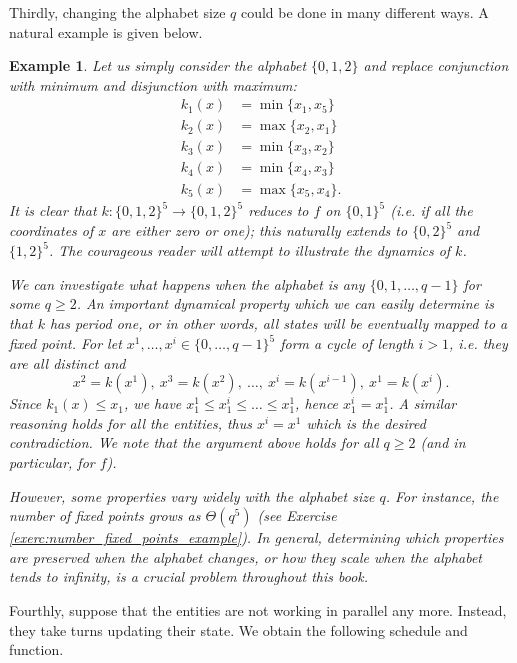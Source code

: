 \documentclass[a4paper, 11pt]{book}
\numberwithin{equation}{section}
\theoremstyle{plain}
\newtheorem{example}	[equation]	{Example}
\renewcommand{\(}{\ldbrack}
\renewcommand{\)}{\rdbrack}
\begin{document}
Thirdly, changing the alphabet size $q$ could be done in many different ways. A natural example is given below.



\begin{example} \label{ex:3_vecC5}
Let us simply consider the alphabet $\{0, 1, 2\}$ and replace conjunction with minimum and disjunction with maximum:
\begin{align*}
	k_1(x) &= \min\{x_1, x_5\}\\
	k_2(x) &= \max\{x_2, x_1\}\\
	k_3(x) &= \min\{x_3, x_2\}\\
	k_4(x) &= \min\{x_4, x_3\}\\
	k_5(x) &= \max\{x_5, x_4\}.
\end{align*}
It is clear that $k : \{0, 1, 2\}^5 \to \{0, 1, 2\}^5$ reduces to $f$ on $\{0,1\}^5$ (i.e. if all the coordinates of $x$ are either zero or one); this naturally extends to $\{0,2\}^5$ and $\{1,2\}^5$. The courageous reader will attempt to illustrate the dynamics of $k$. 

We can investigate what happens when the alphabet is any $\{0, 1, \dots, q-1\}$ for some $q \ge 2$. An important dynamical property which we can easily determine is that $k$ has period one, or in other words, all states will be eventually mapped to a fixed point. For let $x^1, \dots, x^i \in \{0, \dots, q-1\}^5$ form a cycle of length $i > 1$, i.e. they are all distinct and
\[
	x^2 = k(x^1), \ x^3 = k(x^2), \ \dots, \ x^i = k(x^{i-1}), \ x^1 = k(x^i).
\]
Since $k_1(x) \le x_1$, we have $x^1_1 \le x^i_1 \le \dots \le x^1_1$, hence $x^i_1 = x^1_1$. A similar reasoning holds for all the entities, thus $x^i = x^1$ which is the desired contradiction. We note that the argument above holds for all $q \ge 2$ (and in particular, for $f$). 

However, some properties vary widely with the alphabet size $q$. For instance, the number of fixed points grows as $\Theta(q^5)$ (see Exercise \ref{exerc:number_fixed_points_example}). In general, determining which properties are preserved when the alphabet changes, or how they scale when the alphabet tends to infinity, is a crucial problem throughout this book.
\end{example}

Fourthly, suppose that the entities are not working in parallel any more. Instead, they take turns updating their state. We obtain the following schedule and function.
\end{document}
